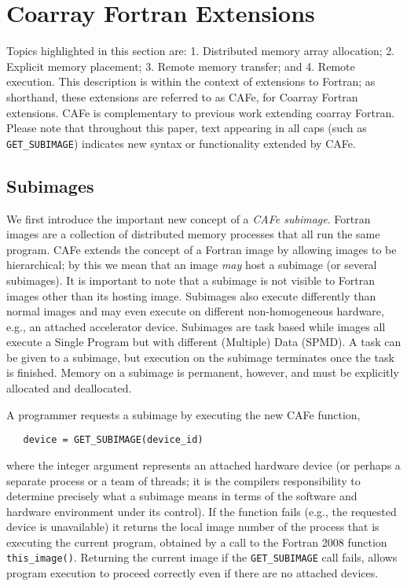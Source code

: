 \section{Coarray Fortran Extensions}

Topics highlighted in this section are: 1. Distributed memory array allocation;
2. Explicit memory placement; 3. Remote memory transfer; and 4. Remote execution.  This
description is within the context of extensions to Fortran; as shorthand, these extensions
are referred to as CAFe, for Coarray Fortran extensions.  CAFe is complementary to
previous work extending coarray Fortran\cite{mellor-crummey:2009:caf2,jin:2011:caf2}.
Please note that throughout this paper, text appearing in all caps (such as
\texttt{GET\_SUBIMAGE}) indicates new syntax or functionality extended by CAFe.



\subsection{Subimages}

We first introduce the important new concept of a \emph{CAFe subimage}.  Fortran images
are a collection of distributed memory processes that all run the same program.  CAFe
extends the concept of a Fortran image by allowing images to be hierarchical; by this we
mean that an image \emph{may} host a subimage (or several subimages).  It is important to
note that a subimage is not visible to Fortran images other than its hosting image.
Subimages also execute differently than normal images and may even execute on different
non-homogeneous hardware, e.g., an attached accelerator device.  Subimages are task based
while images all execute a Single Program but with different (Multiple) Data (SPMD).  A
task can be given to a subimage, but execution on the subimage terminates once the task is
finished.  Memory on a subimage is permanent, however, and must be explicitly allocated
and deallocated.

A programmer requests a subimage by executing the new CAFe function,

\begin{verbatim}
   device = GET_SUBIMAGE(device_id)
\end{verbatim}

\noindent where the integer argument represents an attached hardware device (or perhaps a separate
process or a team of threads; it is the compilers responsibility to determine precisely
what a subimage means in terms of the software and hardware environment under its
control).  If the function fails (e.g., the requested device is unavailable) it returns
the local image number of the process that is executing the current program, obtained by a
call to the Fortran 2008 function \texttt{this\_image()}.  Returning the current image if
the \texttt{GET\_SUBIMAGE} call fails, allows program execution to proceed correctly even if
there are no attached devices.

